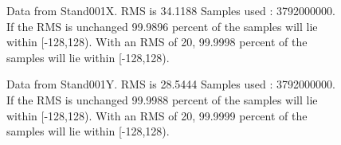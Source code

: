 \begin{figure}[h] 				 				 				\caption{Data from Stand001X. RMS is 34.1188 Samples used : 3792000000. If the RMS is unchanged 99.9896 percent of the samples will lie within [-128,128).  				 With an RMS of 20, 99.9998 percent of the samples will lie within [-128,128).} 				\end{figure} 

\begin{figure}[h] 				 				 				\caption{Data from Stand001Y. RMS is 28.5444 Samples used : 3792000000. If the RMS is unchanged 99.9988 percent of the samples will lie within [-128,128).  				 With an RMS of 20, 99.9999 percent of the samples will lie within [-128,128).} 				\end{figure} 


